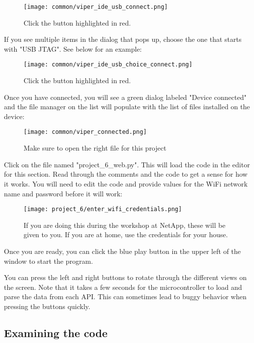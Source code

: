 \begin{figure}[H]
    \centering
    \texttt{[image: common/viper\_ide\_usb\_connect.png]}
    \caption{Click the button highlighted in red.}
\end{figure}

If you see multiple items in the dialog that pops up, choose the one that starts with "USB JTAG". See below for an example:
\begin{figure}[H]
    \centering
    \texttt{[image: common/viper\_ide\_usb\_choice\_connect.png]}
    \caption{Click the button highlighted in red.}
\end{figure}

Once you have connected, you will see a green dialog labeled "Device connected" and the file manager on the list
will populate with the list of files installed on the device:
\begin{figure}[H]
    \centering
    \texttt{[image: common/viper\_connected.png]}
    \caption{Make sure to open the right file for this project}
\end{figure}

Click on the file named "project\_6\_web.py". This will load the code in the editor for this section. Read through the comments
and the code to get a sense for how it works. You will need to edit the code and provide values for the WiFi network name
and password before it will work:

\begin{figure}[H]
    \centering
    \texttt{[image: project\_6/enter\_wifi\_credentials.png]}
    \caption{If you are doing this during the workshop at NetApp, these will be given to you. If you are at home, use the credentials for your house.}
\end{figure}

Once you are ready, you can click the blue play button in the upper left of the window
to start the program.

You can press the left and right buttons to rotate through the different views on the screen. Note that it takes
a few seconds for the microcontroller to load and parse the data from each API. This can sometimes lead to
buggy behavior when pressing the buttons quickly.

\subsection{Examining the code}


